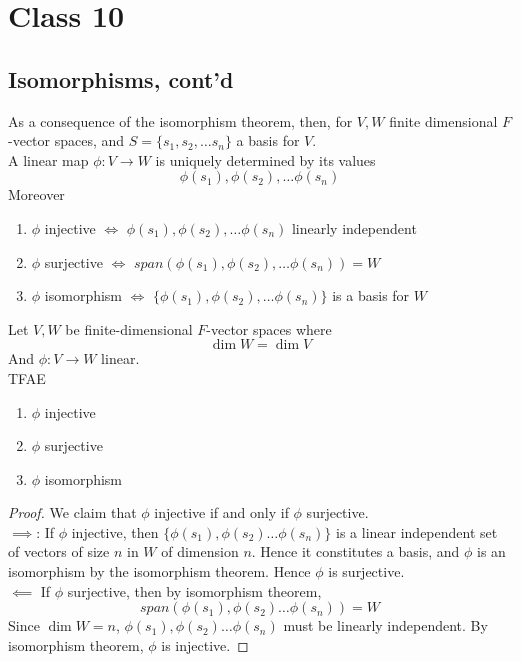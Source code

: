 \section{Class 10}

\subsection{Isomorphisms, cont'd}

\begin{corollary}
    As a consequence of the isomorphism theorem, then, for $V, W$ finite dimensional $F$-vector spaces, and $S = \{ s_1, s_2, \hdots s_n \} $ a basis for $V$. \\

    A linear map $\phi: V \to W$ is uniquely determined by its values 
    \[
        \phi(s_1), \phi(s_2), \hdots \phi(s_n)
    \]
    Moreover 
    \begin{enumerate}
        \item $\phi$ injective $\iff$ $\phi(s_1), \phi(s_2), \hdots \phi(s_n)$ linearly independent 
        \item $\phi$ surjective $\iff$ $span(\phi(s_1), \phi(s_2), \hdots \phi(s_n)) = W$
        \item $\phi$ isomorphism $\iff$ $ \{ \phi(s_1), \phi(s_2), \hdots \phi(s_n) \} $ is a basis for $W$
    \end{enumerate}
\end{corollary}

\begin{corollary}
    Let $V, W$ be finite-dimensional $F$-vector spaces where 
    \[
        \dim W = \dim V
    \]
    And $\phi: V \to W$ linear. \\

    TFAE 
    \begin{enumerate}
        \item $\phi$ injective
        \item $\phi$ surjective
        \item $\phi$ isomorphism
    \end{enumerate}
\end{corollary}

\begin{proof}
    We claim that $\phi$ injective if and only if $\phi$ surjective. \\

    $\implies$: If $\phi$ injective, then $ \{ \phi(s_1), \phi(s_2) \hdots \phi(s_n) \} $ is a linear independent set of vectors of size $n$ in $W$ of dimension $n$. Hence it constitutes a basis, and $\phi$ is an isomorphism by the isomorphism theorem. Hence $\phi$ is surjective. \\

    $\impliedby$ If $\phi$ surjective, then by isomorphism theorem, 
    \[
        span \left( \phi(s_1), \phi(s_2) \hdots \phi(s_n) \right) = W
    \]
    Since $\dim W = n$, $\phi(s_1), \phi(s_2) \hdots \phi(s_n)$ must be linearly independent. By isomorphism theorem, $\phi$ is injective. 
\end{proof}

